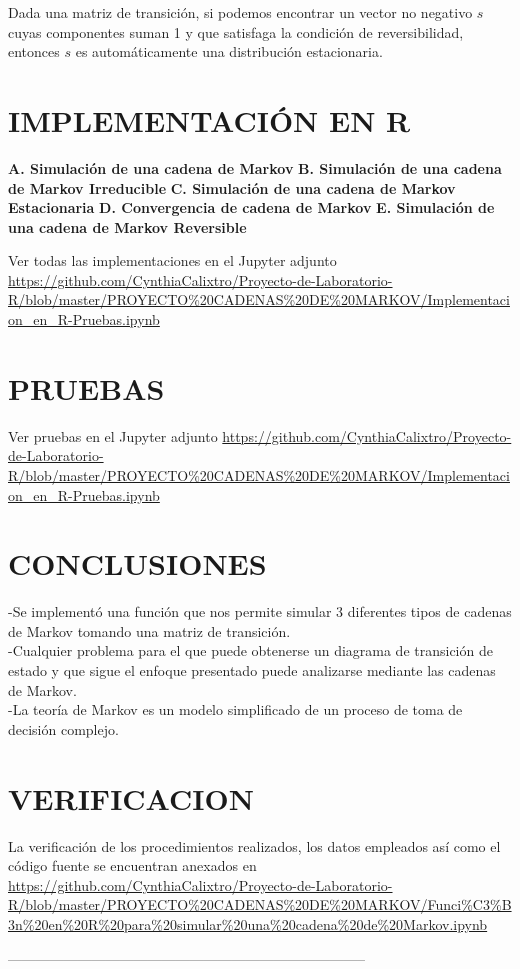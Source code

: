 \documentclass[10pt,a4paper]{article}
\theoremstyle{definition}
\theoremstyle{remark}
\begin{document}
\begin{multicols}{2}
Dada una matriz de transición, si podemos encontrar un vector no negativo $s$ cuyas componentes suman 1 y que satisfaga la condición de reversibilidad, entonces $s$ es automáticamente una distribución estacionaria.


\section{IMPLEMENTACIÓN EN R}
\textbf{A. Simulación de una cadena de Markov}
\textbf{B. Simulación de una cadena de Markov Irreducible}
\textbf{C. Simulación de una cadena de Markov Estacionaria}
\textbf{D. Convergencia de cadena de Markov}
\textbf{E. Simulación de una cadena de Markov Reversible}

 Ver todas las implementaciones en el Jupyter adjunto \url{https://github.com/CynthiaCalixtro/Proyecto-de-Laboratorio-R/blob/master/PROYECTO%20CADENAS%20DE%20MARKOV/Implementacion_en_R-Pruebas.ipynb}
\section{PRUEBAS}
Ver pruebas en el Jupyter adjunto  \url {https://github.com/CynthiaCalixtro/Proyecto-de-Laboratorio-R/blob/master/PROYECTO%20CADENAS%20DE%20MARKOV/Implementacion_en_R-Pruebas.ipynb}
\section{CONCLUSIONES}
\noindent -Se implementó una función que nos permite simular 3 diferentes tipos de cadenas de Markov tomando una matriz de transición.\\
-Cualquier problema para el que puede obtenerse un diagrama de transición de estado y que sigue el enfoque presentado puede analizarse mediante las cadenas de Markov. \\
-La teoría de Markov es un modelo simplificado de un proceso de toma de decisión complejo. 
\section{VERIFICACION}
La verificación de los procedimientos realizados, los datos empleados así como el código fuente se encuentran anexados en \url{https://github.com/CynthiaCalixtro/Proyecto-de-Laboratorio-R/blob/master/PROYECTO%20CADENAS%20DE%20MARKOV/Funci%C3%B3n%20en%20R%20para%20simular%20una%20cadena%20de%20Markov.ipynb}
  
\end{multicols}
\begin{center}
 -----------------------------------------------------------------------------
\end{center}
\end{document}
